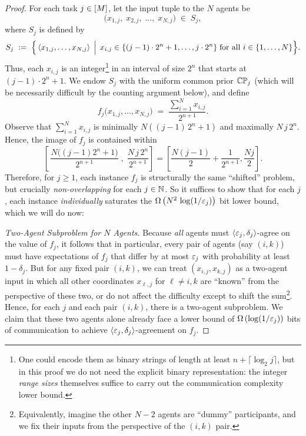 \begin{proof}
For each task $j \in [M]$, let the input tuple to the $N$ agents be
\begin{equation*}
\bigl(x_{1,j},\;x_{2,j},\;\dots,\;x_{N,j}\bigr) \;\in\; S_j,
\end{equation*}
where $S_j$ is defined by
\begin{equation*}
S_j \;:=\;\Bigl\{\,\langle x_{1,j},\dots,x_{N,j}\rangle \,\Bigm|\,
x_{i,j} \in \{(j-1)\cdot 2^n + 1,\dots,j \cdot 2^n\}\;\text{for all }i \in \{1,\dots,N\}\Bigr\}.
\end{equation*}
Thus, each $x_{i,j}$ is an integer\footnote{One could encode them as binary strings of length at least $n + \lceil \log_2 j\rceil$, but in this proof we do not need the explicit binary representation: the integer \emph{range sizes} themselves suffice to carry out the communication complexity lower bound.} in an interval of size $2^n$ that starts at $(j-1)\cdot 2^n + 1$.
We endow $S_j$ with the uniform common prior $\mathbb{C}\mathbb{P}_j$ (which will be necessarily difficult by the counting argument below), and define
\begin{equation*}
f_j\bigl(x_{1,j},\dots,x_{N,j}\bigr) \;=\;
   \frac{\sum_{i=1}^N x_{i,j}}{2^{n+1}}.
\end{equation*}
Observe that $\sum_{i=1}^N x_{i,j}$ is minimally $N\left((j-1)\,2^n + 1\right)$ and maximally $N\,j\,2^n$.
Hence, the image of $f_j$ is contained within
\begin{equation*}
  \left[\,
    \frac{N\bigl((j-1)2^n + 1\bigr)}{2^{n+1}}
    \;,\;
    \frac{N \, j \, 2^n}{2^{n+1}}
  \right] = \left[ \frac{N(j-1)}{2} + \frac{1}{2^{n+1}}, \frac{Nj}{2} \right].
\end{equation*}
Therefore, for $j \ge 1$, each instance $f_j$ is structurally the same ``shifted'' problem, but crucially \emph{non-overlapping} for each $j \in \mathbb{N}$.
So it suffices to show that for each $j$, each instance \emph{individually} saturates the $\Omega\left(N^2\,\log(1/\varepsilon_j)\right)$ bit lower bound, which we will do now:

\emph{Two-Agent Subproblem for $N$ Agents.}
Because \emph{all} agents must $\left \langle \varepsilon_j,\delta_j \right \rangle $-agree on the value of $f_j$, it follows that in particular, every pair of agents (say $(i,k)$) must have expectations of $f_j$ that differ by at most $\varepsilon_j$ with probability at least $1-\delta_j$.
But for any fixed pair $(i,k)$, we can treat $\left(x_{i,j}, x_{k,j}\right)$ as a two‐agent input in which all other coordinates $x_{\ell,j}$ for $\ell\neq i,k$ are ``known'' from the perspective of these two, or do not affect the difficulty
except to shift the sum\footnote{Equivalently, imagine the other $N-2$ agents are ``dummy'' participants, and we fix their inputs from the perspective of the $(i,k)$ pair.}.
Hence, for each $j$ and each pair $(i,k)$, there is a
two‐agent subproblem.
We claim that these two agents alone already face a lower bound of $\Omega\left(\log(1/\varepsilon_j)\right)$ bits of communication to achieve $\left \langle \varepsilon_j,\delta_j \right \rangle $-agreement on $f_j$.


\end{proof}
